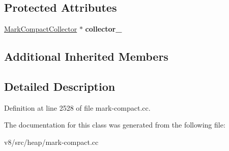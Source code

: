 \subsection*{Protected Attributes}
\begin{DoxyCompactItemize}
\item 
\mbox{\label{classv8_1_1internal_1_1FullEvacuator_a61709afa31eb41438385e1e610e072af}} 
\mbox{\hyperlink{classv8_1_1internal_1_1MarkCompactCollector}{Mark\+Compact\+Collector}} $\ast$ {\bfseries collector\+\_\+}
\end{DoxyCompactItemize}
\subsection*{Additional Inherited Members}


\subsection{Detailed Description}


Definition at line 2528 of file mark-\/compact.\+cc.



The documentation for this class was generated from the following file\+:\begin{DoxyCompactItemize}
\item 
v8/src/heap/mark-\/compact.\+cc\end{DoxyCompactItemize}
